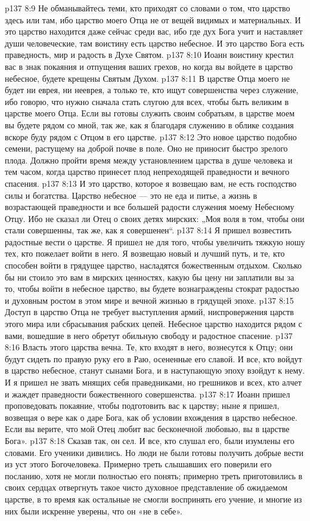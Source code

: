 \vs p137 8:9 Не обманывайтесь теми, кто приходят со словами о том, что царство здесь или там, ибо царство моего Отца не от вещей видимых и материальных. И это царство находится даже сейчас среди вас, ибо где дух Бога учит и наставляет души человеческие, там воистину есть царство небесное. И это царство Бога есть праведность, мир и радость в Духе Святом.
\vs p137 8:10 Иоанн воистину крестил вас в знак покаяния и отпущения ваших грехов, но когда вы войдете в царство небесное, будете крещены Святым Духом.
\vs p137 8:11 В царстве Отца моего не будет ни еврея, ни нееврея, а только те, кто ищут совершенства через служение, ибо говорю, что нужно сначала стать слугою для всех, чтобы быть великим в царстве моего Отца. Если вы готовы служить своим собратьям, в царстве моем вы будете рядом со мной, так же, как я благодаря служению в облике создания вскоре буду рядом с Отцом в его царстве.
\vs p137 8:12 Это новое царство подобно семени, растущему на доброй почве в поле. Оно не приносит быстро зрелого плода. Должно пройти время между установлением царства в душе человека и тем часом, когда царство принесет плод непреходящей праведности и вечного спасения.
\vs p137 8:13 И это царство, которое я возвещаю вам, не есть господство силы и богатства. Царство небесное --- это не еда и питье, а жизнь в возрастающей праведности и все большей радости служения моему Небесному Отцу. Ибо не сказал ли Отец о своих детях мирских: „Моя воля в том, чтобы они стали совершенны, так же, как я совершенен“.
\vs p137 8:14 Я пришел возвестить радостные вести о царстве. Я пришел не для того, чтобы увеличить тяжкую ношу тех, кто пожелает войти в него. Я возвещаю новый и лучший путь, и те, кто способен войти в грядущее царство, насладятся божественным отдыхом. Сколько бы ни стоило это вам в мирских ценностях, какую бы цену ни заплатили вы за то, чтобы войти в небесное царство, вы будете вознаграждены стократ радостью и духовным ростом в этом мире и вечной жизнью в грядущей эпохе.
\vs p137 8:15 Доступ в царство Отца не требует выступления армий, ниспровержения царств этого мира или сбрасывания рабских цепей. Небесное царство находится рядом с вами, вошедшие в него обретут обильную свободу и радостное спасение.
\vs p137 8:16 Власть этого царства вечна. Те, кто входят в него, вознесутся к Отцу; они будут сидеть по правую руку его в Раю, осененные его славой. И все, кто войдут в царство небесное, станут сынами Бога, и в наступающую эпоху взойдут к нему. И я пришел не звать мнящих себя праведниками, но грешников и всех, кто алчет и жаждет праведности божественного совершенства.
\vs p137 8:17 Иоанн пришел проповедовать покаяние, чтобы подготовить вас к царству; ныне я пришел, возвещая о вере как о даре Бога, как об условии вхождения в царство небесное. Если вы верите, что мой Отец любит вас бесконечной любовью, вы в царстве Бога».
\vs p137 8:18 \pc Сказав так, он сел. И все, кто слушал его, были изумлены его словами. Его ученики дивились. Но люди не были готовы получить добрые вести из уст этого Богочеловека. Примерно треть слышавших его поверили его посланию, хотя не могли полностью его понять; примерно треть приготовились в своих сердцах отвергнуть такое чисто духовное представление об ожидаемом царстве, в то время как остальные не смогли воспринять его учение, и многие из них были искренне уверены, что он «не в себе».
